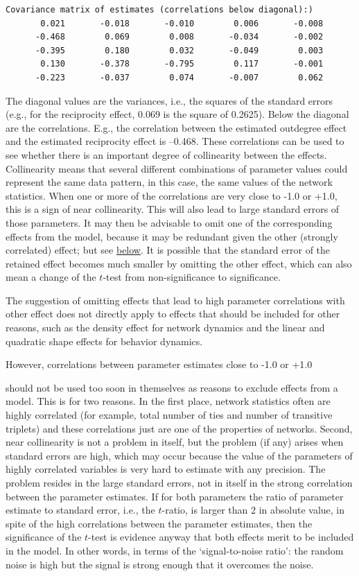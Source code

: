 \documentclass[a4paper,fleqn,11pt]{article}
\newcommand{\+}{\, + \,}
\begin{document}
{\footnotesize
\begin{verbatim}
Covariance matrix of estimates (correlations below diagonal):)
       0.021       -0.018       -0.010        0.006       -0.008
      -0.468        0.069        0.008       -0.034       -0.002
      -0.395        0.180        0.032       -0.049        0.003
       0.130       -0.378       -0.795        0.117       -0.001
      -0.223       -0.037        0.074       -0.007        0.062
\end{verbatim}
}
The diagonal values are the variances, i.e., the squares of the
standard errors (e.g., for the reciprocity effect,
0.069 is the square of  0.2625). Below the
diagonal are the correlations. E.g., the correlation between the
estimated outdegree effect and the estimated reciprocity effect is
--0.468. These correlations can be used to see whether there is an
important degree of collinearity between the effects. Collinearity
means that several different combinations of parameter values
could represent the same data pattern, in
this case, the same values of the network statistics. When one or
more of the correlations are very close to -1.0 or +1.0, this is a
sign of near collinearity. This will also lead to large standard errors
of those parameters. It may then be advisable to omit one of the
corresponding effects from the model, because it may be redundant
given the other (strongly correlated) effect; but see
\hyperlink{T_collinearity}{below}. It is possible that
the standard error of the retained effect becomes much smaller by
omitting the other effect, which can also mean a change of the
$t$-test from non-significance to significance.

The suggestion of omitting effects that lead to high parameter
correlations with other effect does not directly apply to
effects that should be included for other reasons, such as
the density effect for network dynamics and the linear and
quadratic shape effects for behavior dynamics.

\hypertarget{T_collinearity}{However, correlations between
parameter estimates close to -1.0 or +1.0}
should not be used too soon in themselves as reasons to exclude effects
from a model. This is for two reasons.
In the first place, network statistics often are highly correlated
(for example, total number of ties and number of transitive triplets)
and these correlations just are one of the properties of networks.
Second, near collinearity is not a problem in itself,
but the problem (if any) arises when standard errors are high,
which may occur
because the value of the parameters of highly correlated variables
is very hard to estimate with any precision. The problem resides in the
large standard errors, not in itself in the strong correlation between
the parameter estimates. If for both parameters
the ratio of parameter estimate to standard error,
i.e., the $t$-ratio, is larger than 2 in absolute value,
in spite of the high correlations between the parameter estimates, then
the significance of the $t$-test is evidence anyway that both
effects merit to be included in the model.
In other words, in terms of the `signal-to-noise ratio':
the random noise is high but the signal is strong enough
that it overcomes the noise.
\end{document}
